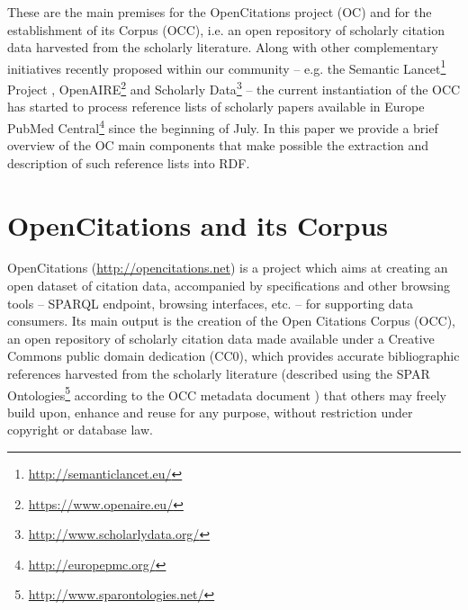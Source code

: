 \documentclass[runningheads,a4paper]{llncs}
\begin{document}
These are the main premises for the OpenCitations project (OC) and for the establishment of its Corpus (OCC), i.e. an open repository of scholarly citation data harvested from the scholarly literature. Along with other complementary initiatives recently proposed within our community -- e.g. the Semantic Lancet\footnote{\url{http://semanticlancet.eu/}} Project  \cite{__RefNumPara__69_1852566440}, OpenAIRE\footnote{\url{https://www.openaire.eu/}} \cite{__RefNumPara__71_1852566440} and Scholarly Data\footnote{\url{http://www.scholarlydata.org/}} \cite{__RefNumPara__75_1852566440} -- the current instantiation of the OCC has started to process reference lists of scholarly papers available in Europe PubMed Central\footnote{\url{http://europepmc.org/}} since the beginning of July. In this paper we provide a brief overview of the OC main components that make possible the extraction and description of such reference lists into RDF.

\section{OpenCitations and its Corpus}

OpenCitations (\url{http://opencitations.net}) is a project which aims at creating an open dataset of citation data, accompanied by specifications and other browsing tools -- SPARQL endpoint, browsing interfaces, etc. -- for supporting data consumers. Its main output is the creation of the Open Citations Corpus (OCC), an open repository of scholarly citation data made available under a Creative Commons public domain dedication (CC0), which provides accurate bibliographic references harvested from the scholarly literature (described using the SPAR Ontologies\footnote{\url{http://www.sparontologies.net/}} \cite{__RefNumPara__17_1852566440} according to the OCC metadata document  \cite{__RefNumPara__19_1852566440}) that others may freely build upon, enhance and reuse for any purpose, without restriction under copyright or database law.
\end{document}

